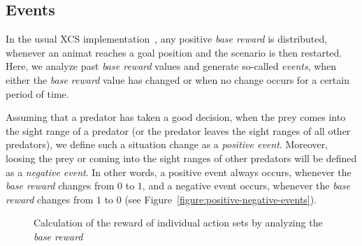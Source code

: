 
\subsection{Events}
\label{subsection:events}

In the usual XCS implementation~\cite{BW02}, any positive \emph{base reward} is distributed, whenever an animat reaches a goal position and the scenario is then restarted. Here, we analyze past \emph{base reward} values and generate so-called \emph{events}, when either the \emph{base reward} value has changed or when no change occurs for a certain period of time.

Assuming that a predator has taken a good decision, when the prey comes into the sight range of a predator (or the predator leaves the sight ranges of all other predators), we define such a situation change as a \emph{positive event}. Moreover, loosing the prey or coming into the sight ranges of other predators will be defined as a \emph{negative event}. In other words, a positive event always occurs, whenever the \emph{base reward} changes from $0$ to $1$, and a negative event occurs, whenever the \emph{base reward} changes from $1$ to $0$ (see Figure~\ref{figure:positive-negative-events}).

\begin{figure*}[ht]
  \hfill
  \hfill
	\caption{Calculation of the reward of individual action sets by analyzing the \emph{base reward}}
	\label{figure:experiment}
\end{figure*}


